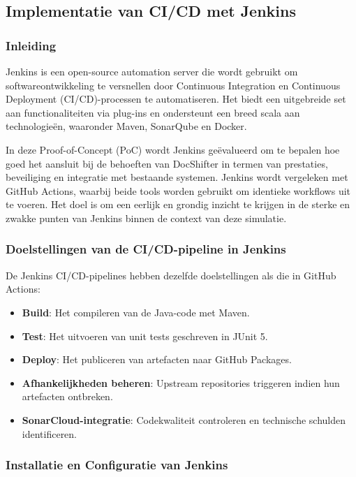\subsection{Implementatie van CI/CD met Jenkins}

\subsubsection{Inleiding}

Jenkins is een open-source automation server die wordt gebruikt om softwareontwikkeling te versnellen door Continuous Integration en Continuous Deployment (CI/CD)-processen te automatiseren. Het biedt een uitgebreide set aan functionaliteiten via plug-ins en ondersteunt een breed scala aan technologieën, waaronder Maven, SonarQube en Docker.

In deze Proof-of-Concept (PoC) wordt Jenkins geëvalueerd om te bepalen hoe goed het aansluit bij de behoeften van DocShifter in termen van prestaties, beveiliging en integratie met bestaande systemen. Jenkins wordt vergeleken met GitHub Actions, waarbij beide tools worden gebruikt om identieke workflows uit te voeren. Het doel is om een eerlijk en grondig inzicht te krijgen in de sterke en zwakke punten van Jenkins binnen de context van deze simulatie.

\subsubsection{Doelstellingen van de CI/CD-pipeline in Jenkins}

De Jenkins CI/CD-pipelines hebben dezelfde doelstellingen als die in GitHub Actions:
\begin{itemize}
    \item \textbf{Build}: Het compileren van de Java-code met Maven.
    \item \textbf{Test}: Het uitvoeren van unit tests geschreven in JUnit 5.
    \item \textbf{Deploy}: Het publiceren van artefacten naar GitHub Packages.
    \item \textbf{Afhankelijkheden beheren}: Upstream repositories triggeren indien hun artefacten ontbreken.
    \item \textbf{SonarCloud-integratie}: Codekwaliteit controleren en technische schulden identificeren.
\end{itemize}

\subsubsection{Installatie en Configuratie van Jenkins}
